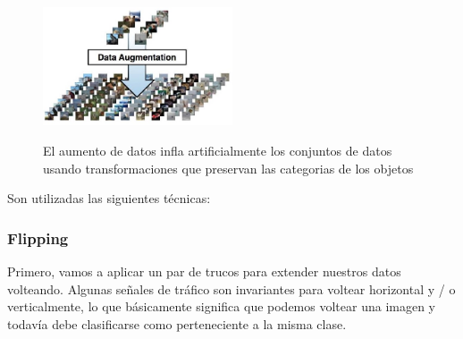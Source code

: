 		\begin{figure}[H]
		\begin{center}
		\includegraphics[width=0.5\textwidth ]{images/desarrollo/Augment/exampleaug}
		\end{center}
		\begin{center}
		\caption{\small{El aumento de datos infla artificialmente los conjuntos de datos usando transformaciones que preservan las categorias de los objetos}}
		{\small{\cite{DL_augmentData}}}
		\end{center}
		\vspace{-1.5em}
		\end{figure}


		Son utilizadas las siguientes técnicas:
		
		
		\subsubsection{Flipping}
		
			Primero, vamos a aplicar un par de trucos para extender nuestros datos volteando. Algunas señales de tráfico son invariantes para voltear horizontal y / o verticalmente, lo que básicamente significa que podemos voltear una imagen y todavía debe clasificarse como perteneciente a la misma clase.

